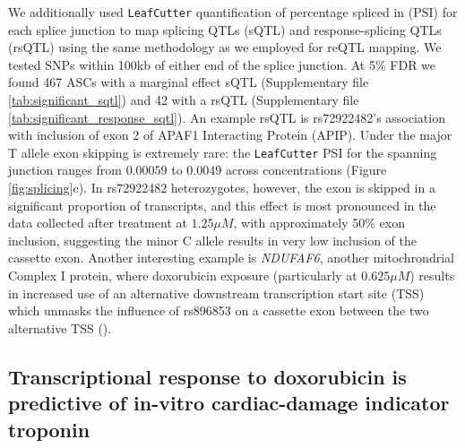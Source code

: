 \documentclass[9pt,lineno]{elife}
\begin{document}
We additionally used \texttt{LeafCutter} quantification of percentage spliced in (PSI) for each splice junction to map splicing QTLs (sQTL) and response-splicing QTLs (rsQTL) using the same methodology as we employed for reQTL mapping. We tested SNPs within 100kb of either end of the splice junction. At 5\% FDR we found 467 ASCs with a marginal effect sQTL (Supplementary file \ref{tab:significant_sqtl}) and 42 with a rsQTL (Supplementary file \ref{tab:significant_response_sqtl}). An example rsQTL is rs72922482's association with inclusion of exon 2 of APAF1 Interacting Protein (APIP). Under the major T allele exon skipping is extremely rare: the \texttt{LeafCutter} PSI for the spanning junction ranges from $0.00059$ to $0.0049$ across concentrations (Figure \ref{fig:splicing}c). In rs72922482 heterozygotes, however, the exon is skipped in a significant proportion of transcripts, and this effect is most pronounced in the data collected after treatment at $1.25 \mu M$, with approximately 50\% exon inclusion, suggesting the minor C allele results in very low inclusion of the cassette exon. Another interesting example is \emph{NDUFAF6}, another mitochrondrial Complex I protein, where doxorubicin exposure (particularly at $0.625 \mu M$) results in increased use of an alternative downstream transcription start site (TSS) which unmasks the influence of rs896853 on a cassette exon between the two alternative TSS ().

\subsection*{Transcriptional response to doxorubicin is predictive of in-vitro cardiac-damage indicator troponin}
\end{document}
